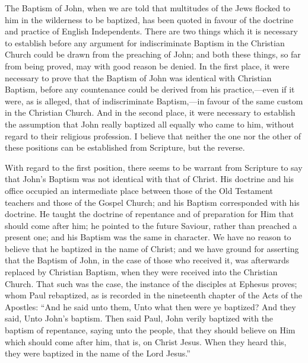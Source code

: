 \documentclass[]{book}
\begin{document}
The Baptism of John, when we are told that multitudes of the Jews flocked to him in the wilderness to be baptized, has been quoted in favour of the doctrine and practice of English Independents. There are two things which it is necessary to establish before any argument for indiscriminate Baptism in the Christian Church could be drawn from the preaching of John; and both these things, so far from being proved, may with good reason be denied. In the first place, it were necessary to prove that the Baptism of John was identical with Christian Baptism, before any countenance could be derived from his practice,---even if it were, as is alleged, that of indiscriminate Baptism,---in favour of the same custom in the Christian Church. And in the second place, it were necessary to establish the assumption that John really baptized all equally who came to him, without regard to their religious profession. I believe that neither the one nor the other of these positions can be established from Scripture, but the reverse.

With regard to the first position, there seems to be warrant from Scripture to say that John's Baptism was not identical with that of Christ. His doctrine and his office occupied an intermediate place between those of the Old Testament teachers and those of the Gospel Church; and his Baptism corresponded with his doctrine. He taught the doctrine of repentance and of preparation for Him that should come after him; he pointed to the future Saviour, rather than preached a present one; and his Baptism was the same in character. We have no reason to believe that he baptized in the name of Christ; and we have ground for asserting that the Baptism of John, in the case of those who received it, was afterwards replaced by Christian Baptism, when they were received into the Christian Church. That such was the case, the instance of the disciples at Ephesus proves; whom Paul rebaptized, as is recorded in the nineteenth chapter of the Acts of the Apostles: ``And he said unto them, Unto what then were ye baptized? And they said, Unto John's baptism. Then said Paul, John verily baptized with the baptism of repentance, saying unto the people, that they should believe on Him which should come after him, that is, on Christ Jesus. When they heard this, they were baptized in the name of the Lord Jesus.''
\end{document}
